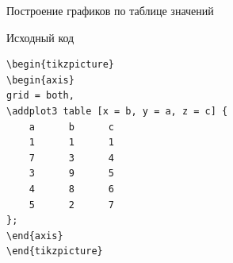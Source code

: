 \documentclass{beamer}[aspectratio=169]
\begin{document}
\begin{frame}{Построение графиков по таблице значений}

\begin{figure}[h!]
\setlength{\fboxsep}{0pt}%
\setlength{\fboxrule}{0pt}%
%
\end{figure}
\end{frame}

\begin{frame}[fragile]{Исходный код}
\begin{adjustbox}{scale=0.8}
\begin{large}
\transwipe

 \begin{lstlisting}[language=Tex]
  \begin{tikzpicture}
\begin{axis}
grid = both,
\addplot3 table [x = b, y = a, z = c] {
	a      b      c
	1      1      1
	7      3      4 
	3      9      5 
	4      8      6
	5      2      7
};
\end{axis}
\end{tikzpicture}

\end{lstlisting}
\end{large}
\end{adjustbox}
\end{frame}
\end{document}
